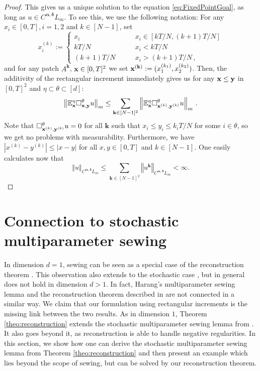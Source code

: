 \documentclass[12pt]{article}
\numberwithin{equation}{section}
\theoremstyle{plain}
\theoremstyle{definition}
\newcommand{\abs}[1]{\left\vert #1 \right\vert}
\newcommand{\norm}[1]{\left\Vert #1\right\Vert}
\def\bE{\mathbb{E}}\def\bW{\mathbb{W}}
\def\fk{\mathbf k}\def\fl{\mathbf l}
\def\fy{\mathbf y}\def\fz{\mathbf z}
\def\falpha{{\boldsymbol\alpha}}
\def\fdelta{{\boldsymbol\delta}}
\begin{document}
\begin{proof}
     This gives us a unique solution to the equation \eqref{eq:FixedPointGoal}, as long as $u\in C^{\falpha,\fdelta}L_m$. To see this, we use the following notation: For any $x_i\in[0,T], i=1,2$ and $k\in[N-1]$, set
     \begin{equation*}
         x_i^{(k)} := \begin{cases}
            x_i\qquad &x_i \in[kT/N,(k+1)T/N] \\
            kT/N \qquad &x_i<kT/N \\
            (k+1)T/N \qquad &x_i>(k+1)T/N\,,
         \end{cases}
     \end{equation*}
     and for any patch $A^{\fk}$, $\mathbf x\in[0,T]^2$ we set $\fx^{(\fk)} := (x_1^{(k_1)},x_2^{(k_2)})$. Then, the additivity of the rectangular increment immediately gives us for any $\fx\le\fy$ in $[0,T]^2$ and $\eta\subset\theta\subset[d]$:
     \begin{equation*}
         \norm{\bE^\eta_\fx\square^\theta_{\fx,\fy} u}_m \le \sum_{\fk\in[N-1]^2} \norm{\bE^\eta_\fx \square_{\fx^{(k)},\fy^{(k)}}^\theta u}_m\,.
     \end{equation*}
     Note that $\square^\theta_{\fx^{(k)}, \fy^{(k)}} u = 0$ for all $\fk$ such that $x_i\le y_i \le k_iT/N$ for some $i\in\theta$, so we get no problems with measurability. Furthermore, we have $\abs{x^{(k)} -y^{(k)}} \le\abs{x-y}$ for all $x,y\in[0,T]$ and $k\in[N-1]$. One easily calculates now that
     \begin{equation*}
         \norm{u}_{C^{\falpha,\fdelta}L_m} \le \sum_{\fk\in[N-1]^2} \norm{u^\fk}_{C^{\falpha,\fdelta}L_m} <\infty.
     \end{equation*}
\end{proof}





\section{Connection to stochastic multiparameter sewing}\label{sec:sto_sewing}

In dimension $d=1$, sewing can be seen as a special case of the reconstruction theorem \cite{Broux2022}. This observation also extends to the stochastic case \cite{kern2021}, but in general does not hold in dimension $d>1$. In fact, Harang's multiparameter sewing lemma \cite{harang21} and the reconstruction theorem described in \cite{zambotti2020} are not connected in a similar way. We claim that our formulation using rectangular increments is the missing link between the two results. As in dimension $1$, Theorem \ref{theo:reconstruction} extends the stochastic multiparameter sewing lemma from \cite{multiparameterStochSewing}. It also goes beyond it, as reconstruction is able to handle negative regularities. In this section, we show how one can derive the stochastic multiparameter sewing lemma from Theorem \ref{theo:reconstruction} and then present an example which lies beyond the scope of sewing, but can be solved by our reconstruction theorem.
\end{document}
